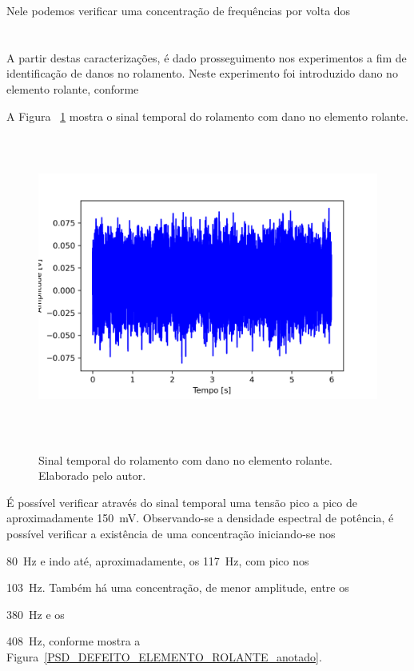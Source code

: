 \documentclass[
	12pt,				
	oneside,			
	a4paper,			
	english,			
	brazil,			
	]{abntex2ppgsi}
\begin{document}
{{{{{{{{{{{{{Nele podemos verificar uma concentração de frequências por volta dos 

\newpage
\section{}

A partir destas caracterizações, é dado prosseguimento nos experimentos a fim de identificação de danos no rolamento. Neste experimento foi introduzido dano no elemento rolante, conforme 

A Figura ~\ref{DEFEITO_ELEMENTO_ROLANTE} mostra o sinal temporal do rolamento com dano no elemento rolante. 

\begin{figure}[H]
\centering
\caption {Sinal temporal do rolamento com dano no elemento rolante. Elaborado pelo autor.}
\includegraphics[width=\textwidth,height=100mm,keepaspectratio]{GraficosAnalise/DEFEITO_ELEMENTO_ROLANTE}
\label{DEFEITO_ELEMENTO_ROLANTE}
\end{figure} 

É possível verificar através do sinal temporal uma tensão pico a pico de aproximadamente {\SI{150}{\milli\volt}}. Observando-se a densidade espectral de potência, é possível verificar a existência de uma concentração iniciando-se nos {\SI{80}{\hertz} e indo até, aproximadamente, os {\SI{117}{\hertz}}, com pico nos {\SI{103}{\hertz}. Também há uma concentração, de menor amplitude, entre os {\SI{380}{\hertz} e os {\SI{408}{\hertz}, conforme mostra a Figura~\ref{PSD_DEFEITO_ELEMENTO_ROLANTE_anotado}.

}}}}}}}}}}}}}}}}}
\end{document}
